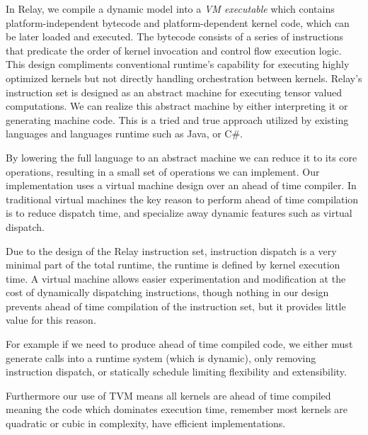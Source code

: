 

In Relay, we compile a dynamic model into a {\em VM executable} which contains
  platform-independent bytecode and platform-dependent kernel code, which can be later loaded and executed.
The bytecode consists of a series of instructions that predicate the order of kernel invocation and control flow execution logic.
This design compliments conventional runtime's capability for executing highly optimized kernels but not directly handling orchestration between kernels.
Relay's instruction set is designed as an abstract machine for executing tensor valued
computations. We can realize this abstract machine by either interpreting it or generating
machine code. This is a tried and true approach utilized by existing languages and languages
runtime such as Java, or C\#.

By lowering the full language to an abstract machine we can reduce it to its core operations,
resulting in a small set of operations we can implement. Our implementation uses a virtual
machine design over an ahead of time compiler. In traditional virtual machines the key
reason to perform ahead of time compilation is to reduce dispatch time, and specialize
away dynamic features such as virtual dispatch.

Due to the design of the Relay instruction set, instruction dispatch is a very minimal
part of the total runtime, the runtime is defined by kernel execution time.
A virtual machine allows easier experimentation and modification at the cost of dynamically
dispatching instructions, though nothing in our design prevents ahead of time compilation
of the instruction set, but it provides little value for this reason.

For example if we need to produce ahead of time
compiled code, we either must generate calls into a runtime system (which is dynamic),
only removing instruction dispatch, or statically schedule limiting flexibility and
extensibility.

Furthermore our use of TVM means all kernels are ahead of time compiled meaning the
code which dominates execution time, remember most kernels are quadratic or cubic in
complexity, have efficient implementations.

